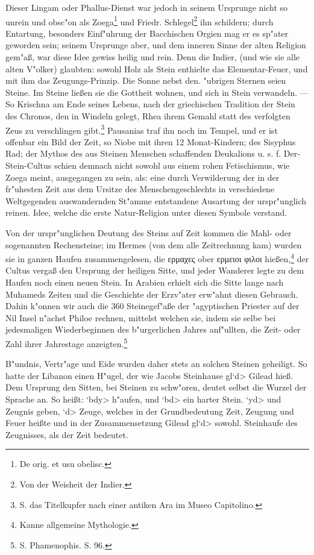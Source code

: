 \documentclass[a4paper, 11pt, oneside, polutonikogreek, german]{article}
\begin{document}
Dieser Lingam oder Phallus-Dienst war jedoch in seinem Ursprunge nicht so unrein und obsc"on als Zoega\footnote{De orig. et usu obelisc.} und Friedr. Schlegel\footnote{Von der Weisheit der Indier.} ihn schildern; durch Entartung, besonders Einf"uhrung der Bacchischen Orgien mag er es sp"ater geworden sein; seinem Ursprunge aber, und dem inneren Sinne der alten Religion gem"aß, war diese Idee gewiss heilig und rein. Denn die Indier, (und wie sie alle alten V"olker) glaubten: sowohl Holz als Stein enthielte das Elementar-Feuer, und mit ihm das Zeugungs-Prinzip. Die Sonne nebst den. "ubrigen Sternen seien Steine. Im Steine ließen sie die Gottheit wohnen, und sich in Stein verwandeln. --- So Krischna am Ende seines Lebens, nach der griechischen Tradition der Stein des Chronos, den in Windeln gelegt, Rhea ihrem Gemahl statt des verfolgten Zeus zu verschlingen gibt.\footnote{S. das Titelkupfer nach einer antiken Ara im Museo Capitolino.} Pausanias traf ihn noch im Tempel, und er ist offenbar ein Bild der Zeit, so Niobe mit ihren 12 Monat-Kindern; des Sisyphus Rad; der Mythos des aus Steinen Menschen schaffenden Deukalions u. s. f. Der-Stein-Cultus schien demnach nicht sowohl aus einem rohen Fetischismus, wie Zoega meint, ausgegangen zu sein, als: eine durch Verwilderung der in der fr"uhesten Zeit aus dem Ursitze des Menschengeschlechts in verschiedene Weltgegenden auswandernden St"amme entstandene Ausartung der urspr"unglich reinen. Idee, welche die erste Natur-Religion unter diesen Symbole verstand.

Von der urspr"unglichen Deutung des Steins auf Zeit kommen die Mahl- oder sogenannten Rechensteine; im Hermes (von dem alle Zeitrechnung kam) wurden sie in ganzen Haufen zusammengelesen, die ερμαχες ober ερμειοι φιλοι hießen,\footnote{Kanne allgemeine Mythologie.} der Cultus vergaß den Ursprung der heiligen Sitte, und jeder Wanderer legte zu dem Haufen noch einen neuen Stein. In Arabien erhielt sich die Sitte lange nach Muhameds Zeiten und die Geschichte der Erzv"ater erw"ahnt diesen Gebrauch. Dahin k"onnen wir auch die 360 Steinegef"aße der "agyptischen Priester auf der Nil Insel n"achst Philoe rechnen, mittelst welchen sie, indem sie selbe bei jedesmaligen Wiederbeginnen des b"urgerlichen Jahres anf"ullten, die Zeit- oder Zahl ihrer Jahrestage anzeigten.\footnote{S. Phamenophis. S. 96.}

B"undnis, Vertr"age und Eide wurden daher stets an solchen Steinen geheiligt. So hatte der Libanon einen H"ugel, der wie Jacobs Steinhause \<gl`d> Gilead hieß. Dem Ursprung den Sitten, bei Steinen zu schw"oren, deutet selbst die Wurzel der Sprache an. So heißt: \<`bdy> h"aufen, und \<`bd> ein harter Stein. \<`yd> und Zeugnis geben, \<`d> Zeuge, welches in der Grundbedeutung Zeit, Zeugung und Feuer heißte und in der Zusammensetzung Gilead \<gl`d> sowohl. Steinhaufe des Zeugnisses, als der Zeit bedeutet.
\end{document}
